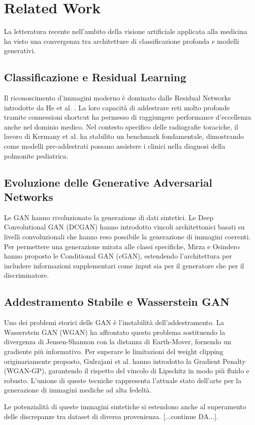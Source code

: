 \section{Related Work}
\label{sec:Related_Works}

La letteratura recente nell'ambito della visione artificiale applicata alla medicina ha visto una convergenza tra architetture di classificazione profonda e modelli generativi.

\subsection{Classificazione e Residual Learning}

Il riconoscimento d'immagini moderno è dominato dalle Residual Networks introdotte da He et al. \cite{He_2016_CVPR}. La loro capacità di addestrare reti molto profonde tramite connessioni shortcut ha permesso di raggiungere performance d'eccellenza anche nel dominio medico. Nel contesto specifico delle radiografie toraciche, il lavoro di Kermany et al. \cite{kermany2018identifying} ha stabilito un benchmark fondamentale, dimostrando come modelli pre-addestrati possano assistere i clinici nella diagnosi della polmonite pediatrica.

\subsection{Evoluzione delle Generative Adversarial Networks}

Le GAN hanno rivoluzionato la generazione di dati sintetici. Le Deep Convolutional GAN (DCGAN) \cite{radford2015unsupervised} hanno introdotto vincoli architettonici basati su livelli convoluzionali che hanno reso possibile la generazione di immagini coerenti. Per permettere una generazione mirata alle classi specifiche, Mirza e Osindero \cite{mirza2014conditionalgenerativeadversarialnets} hanno proposto le Conditional GAN (cGAN), estendendo l'architettura per includere informazioni supplementari come input sia per il generatore che per il discriminatore.

\subsection{Addestramento Stabile e Wasserstein GAN}

Uno dei problemi storici delle GAN è l'instabilità dell'addestramento. La Wasserstein GAN (WGAN) \cite{arjovsky2017wasserstein} ha affrontato questo problema sostituendo la divergenza di Jensen-Shannon con la distanza di Earth-Mover, fornendo un gradiente più informativo. Per superare le limitazioni del weight clipping originariamente proposto, Gulrajani et al. \cite{gulrajani2017improved} hanno introdotto la Gradient Penalty (WGAN-GP), garantendo il rispetto del vincolo di Lipschitz in modo più fluido e robusto. L'unione di queste tecniche rappresenta l'attuale stato dell'arte per la generazione di immagini mediche ad alta fedeltà.

Le potenzialità di queste immagini sintetiche si estendono anche al superamento delle discrepanze tra dataset di diversa provenienza. [...continue DA...].
